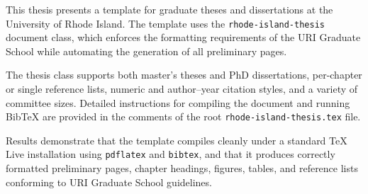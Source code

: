 This thesis presents a template for graduate theses and dissertations
at the University of Rhode Island.
The template uses the \texttt{rhode-island-thesis} document class, which enforces
the formatting requirements of the URI Graduate School while automating
the generation of all preliminary pages.

The thesis class supports both master's theses and PhD dissertations,
per-chapter or single reference lists, numeric and author--year
citation styles, and a variety of committee sizes.
Detailed instructions for compiling the document and running BibTeX are
provided in the comments of the root \texttt{rhode-island-thesis.tex} file.

Results demonstrate that the template compiles cleanly under a standard
TeX Live installation using \texttt{pdflatex} and \texttt{bibtex},
and that it produces correctly formatted preliminary pages, chapter
headings, figures, tables, and reference lists conforming to URI
Graduate School guidelines.
